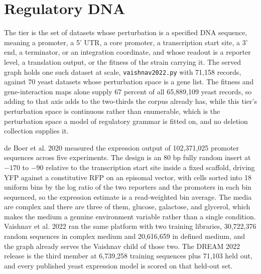 
\section{Regulatory DNA}\label{sec:regdna}

The  tier is the set of datasets whose perturbation is a specified
DNA sequence, meaning a promoter, a 5' UTR, a core promoter, a transcription start site, a 3'
end, a terminator, or an integration coordinate, and whose readout is a reporter level, a
translation output, or the fitness of the strain carrying it. The served graph holds one such
dataset at scale, \texttt{vaishnav2022.py} with 71,158 records, against 70 yeast datasets whose
perturbation space is a gene list. The fitness and gene-interaction maps alone supply 67
percent of all 65,889,109 yeast records, so adding to that axis adds to the two-thirds the
corpus already has, while this tier's perturbation space is continuous rather than enumerable,
which is the perturbation space a model of regulatory grammar is fitted on, and no deletion
collection supplies it.

 de Boer et al. 2020 measured the expression output
of 102,371,025 promoter sequences across five experiments. The design is an 80 bp fully random
insert at $-170$ to $-90$ relative to the transcription start site inside a fixed scaffold,
driving YFP against a constitutive RFP on an episomal vector, with cells sorted into 18 uniform
bins by the log ratio of the two reporters and the promoters in each bin sequenced, so the
expression estimate is a read-weighted bin average. The media are complex and there are three
of them, glucose, galactose, and glycerol, which makes the medium a genuine environment
variable rather than a single condition. Vaishnav et al. 2022 ran the same platform with two
training libraries, 30,722,376 random sequences in complex medium and 20,616,659 in defined
medium, and the graph already serves the Vaishnav child of those two. The DREAM 2022 release is
the third member at 6,739,258 training sequences plus 71,103 held out, and every published
yeast expression model is scored on that held-out set.

